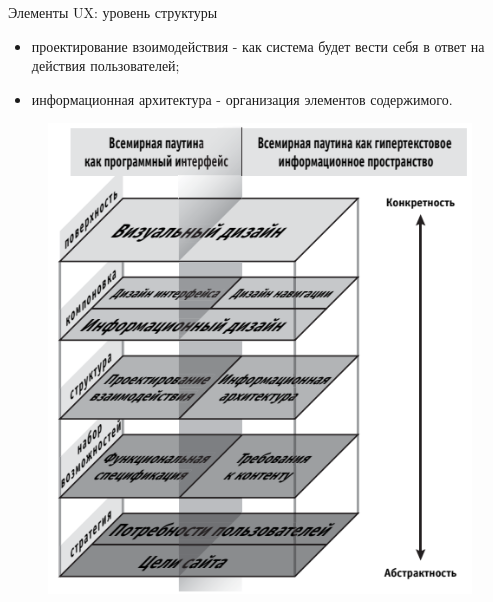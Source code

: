 \documentclass{beamer}
\begin{document}
\begin{frame}{Элементы UX: уровень структуры}
\begin{itemize}
\item проектирование взоимодействия - как система будет вести себя в ответ на действия пользователей;
\item информационная архитектура - организация элементов содержимого.
\end{itemize}
\begin{figure}[h]
\centering
\includegraphics[scale=0.4]{images/lec01-pic12.png}
\end{figure}
\end{frame}
\end{document}
